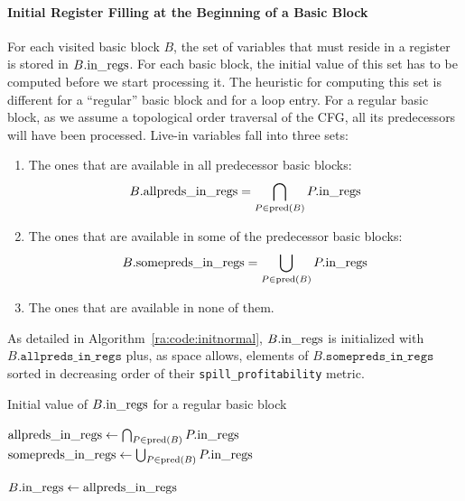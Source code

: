 {\paragraph{Initial Register Filling at the Beginning of a Basic Block}
For each visited basic block $B$, the set of variables that must reside in a register is stored in $B.\textrm{in\_regs}$.
For each basic block, the initial value of this set has to be computed before we start processing it.
The heuristic for computing this set is different for a ``regular'' basic block and for a loop entry.
For a regular basic block, as we assume a topological order traversal of the CFG, all its predecessors will have been processed.
Live-in variables fall into three sets:
\begin{enumerate}
\item The ones that are available in all predecessor basic blocks:
  $$B.\textrm{allpreds\_in\_regs}=\bigcap_{P\in \textrm{pred}(B)} P.\textrm{in\_regs}$$
\item The ones that are available in some of the predecessor basic blocks:
  $$B.\textrm{somepreds\_in\_regs}=\bigcup_{P\in \textrm{pred}(B)} P.\textrm{in\_regs}$$
\item The ones that are available in none of them.
\end{enumerate}

As detailed in Algorithm~\ref{ra:code:initnormal}, $B.\textrm{in\_regs}$ is initialized with $B.\texttt{allpreds\_in\_regs}$ plus, as space allows, elements of $B.\texttt{somepreds\_in\_regs}$ sorted in decreasing order of their \texttt{spill\_profitability} metric.


\begin{algorithm}[h]
\caption{Initial value of $B.\textrm{in\_regs}$ for a regular basic block}
\label{ra:code:initnormal}

  $\textrm{allpreds\_in\_regs} \gets \bigcap_{P\in \textrm{pred}(B)} P.\textrm{in\_regs}$\;
  $\textrm{somepreds\_in\_regs} \gets \bigcup_{P\in \textrm{pred}(B)} P.\textrm{in\_regs}$\;

  $B.\textrm{in\_regs} \gets \textrm{allpreds\_in\_regs}$\;
\end{algorithm}


}
